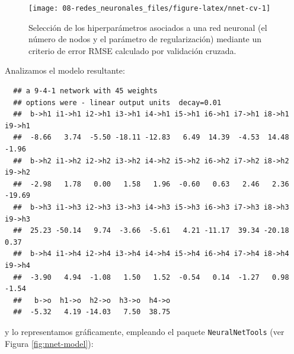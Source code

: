 \documentclass[
]{book}
\newenvironment{Shaded}{\begin{snugshade}}{\end{snugshade}}
\newcommand{\AttributeTok}[1]{\textcolor[rgb]{0.77,0.63,0.00}{#1}}
\newcommand{\ConstantTok}[1]{\textcolor[rgb]{0.00,0.00,0.00}{#1}}
\newcommand{\DecValTok}[1]{\textcolor[rgb]{0.00,0.00,0.81}{#1}}
\newcommand{\FunctionTok}[1]{\textcolor[rgb]{0.00,0.00,0.00}{#1}}
\newcommand{\NormalTok}[1]{#1}
\newcommand{\OtherTok}[1]{\textcolor[rgb]{0.56,0.35,0.01}{#1}}
\newcommand{\SpecialCharTok}[1]{\textcolor[rgb]{0.00,0.00,0.00}{#1}}
\theoremstyle{break}
\theoremstyle{nonumberplain}
\begin{document}
\begin{figure}[!htb]

{\centering \texttt{[image: 08-redes\_neuronales\_files/figure-latex/nnet-cv-1]} 

}

\caption{Selección de los hiperparámetros asociados a una red neuronal (el número de nodos y el parámetro de regularización) mediante un criterio de error RMSE calculado por validación cruzada.}\label{fig:nnet-cv}
\end{figure}

Analizamos el modelo resultante:

\begin{Shaded}
\end{Shaded}

\begin{verbatim}
  ## a 9-4-1 network with 45 weights
  ## options were - linear output units  decay=0.01
  ##  b->h1 i1->h1 i2->h1 i3->h1 i4->h1 i5->h1 i6->h1 i7->h1 i8->h1 i9->h1 
  ##  -8.66   3.74  -5.50 -18.11 -12.83   6.49  14.39  -4.53  14.48  -1.96 
  ##  b->h2 i1->h2 i2->h2 i3->h2 i4->h2 i5->h2 i6->h2 i7->h2 i8->h2 i9->h2 
  ##  -2.98   1.78   0.00   1.58   1.96  -0.60   0.63   2.46   2.36 -19.69 
  ##  b->h3 i1->h3 i2->h3 i3->h3 i4->h3 i5->h3 i6->h3 i7->h3 i8->h3 i9->h3 
  ##  25.23 -50.14   9.74  -3.66  -5.61   4.21 -11.17  39.34 -20.18   0.37 
  ##  b->h4 i1->h4 i2->h4 i3->h4 i4->h4 i5->h4 i6->h4 i7->h4 i8->h4 i9->h4 
  ##  -3.90   4.94  -1.08   1.50   1.52  -0.54   0.14  -1.27   0.98  -1.54 
  ##   b->o  h1->o  h2->o  h3->o  h4->o 
  ##  -5.32   4.19 -14.03   7.50  38.75
\end{verbatim}

y lo representamos gráficamente, empleando el paquete \texttt{NeuralNetTools} (ver Figura \ref{fig:nnet-model}):



\begin{Shaded}
\end{Shaded}
\end{document}
